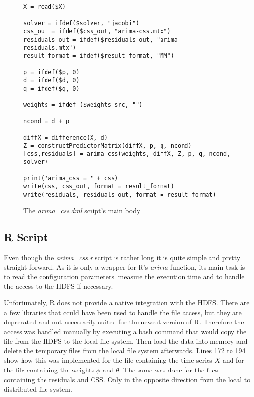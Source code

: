 \begin{figure}[!ht]
\centering
\begin{verbatim}
X = read($X)

solver = ifdef($solver, "jacobi")
css_out = ifdef($css_out, "arima-css.mtx")
residuals_out = ifdef($residuals_out, "arima-residuals.mtx")
result_format = ifdef($result_format, "MM")

p = ifdef($p, 0)
d = ifdef($d, 0)
q = ifdef($q, 0)

weights = ifdef ($weights_src, "")

ncond = d + p

diffX = difference(X, d)
Z = constructPredictorMatrix(diffX, p, q, ncond)
[css,residuals] = arima_css(weights, diffX, Z, p, q, ncond, solver)

print("arima_css = " + css)
write(css, css_out, format = result_format)
write(residuals, residuals_out, format = result_format)
\end{verbatim}
\vspace*{-0.3cm}
\caption{The \textit{arima\_css.dml} script's main body}
\label{fig:arima_css.dml}
\end{figure}

\clearpage

\subsection*{R Script}

Even though the \textit{arima\_css.r} script is rather long it is quite simple and pretty straight forward. As it is only a wrapper for R's \textit{arima} function, its main task is to read the configuration parameters, measure the execution time and to handle the access to the \acl{HDFS} if necessary. 

Unfortunately, R does not provide a native integration with the \acs{HDFS}. There are a few libraries that could have been used to handle the file access, but they are deprecated and not necessarily suited for the newest version of R. Therefore the access was handled manually by executing a bash command that would copy the file from the \acs{HDFS} to the local file system. Then load the data into memory and delete the temporary files from the local file system afterwards. Lines 172 to 194 show how this was implemented for the file containing the time series $X$ and for the file containing the weights $\phi$ and $\theta$. The same was done for the files containing the residuals and \acl{CSS}. Only in the opposite direction from the local to distributed file system.

